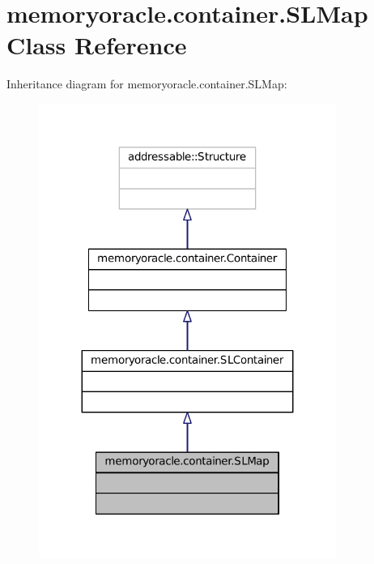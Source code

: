 \hypertarget{classmemoryoracle_1_1container_1_1SLMap}{}\section{memoryoracle.\+container.\+S\+L\+Map Class Reference}
\label{classmemoryoracle_1_1container_1_1SLMap}


Inheritance diagram for memoryoracle.\+container.\+S\+L\+Map\+:\nopagebreak
\begin{figure}[H]
\begin{center}
\leavevmode
\includegraphics[width=275pt]{classmemoryoracle_1_1container_1_1SLMap__inherit__graph}
\end{center}
\end{figure}


